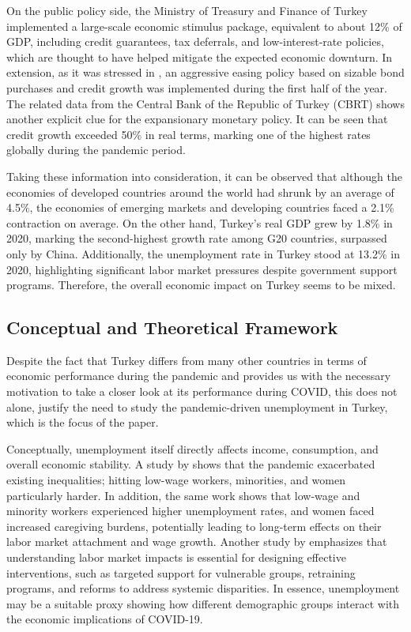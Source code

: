 \documentclass[a4paper,12pt]{article}
\begin{document}
    \indent On the public policy side, the Ministry of Treasury and Finance of Turkey implemented a large-scale economic stimulus package, equivalent to about 12\% of GDP, including credit guarantees, tax deferrals, and low-interest-rate policies, which are thought to have helped mitigate the expected economic downturn. In extension, as it was stressed in \cite{demiralp2020}, an aggressive easing policy based on sizable bond purchases and credit growth was implemented during the first half of the year. The related data from the Central Bank of the Republic of Turkey (CBRT) shows another explicit clue for the expansionary monetary policy. It can be seen that credit growth exceeded 50\% in real terms, marking one of the highest rates globally during the pandemic period.

    \indent Taking these information into consideration, it can be observed that although the economies of developed countries around the world had shrunk by an average of 4.5\%, the economies of emerging markets and developing countries faced a 2.1\% contraction on average. On the other hand, Turkey’s real GDP grew by 1.8\% in 2020, marking the second-highest growth rate among G20 countries, surpassed only by China. Additionally, the unemployment rate in Turkey stood at 13.2\% in 2020, highlighting significant labor market pressures despite government support programs. Therefore, the overall economic impact on Turkey seems to be mixed.
 


\subsection{Conceptual and Theoretical Framework}
\indent Despite the fact that Turkey differs from many other countries in terms of economic performance during the pandemic and provides us with the necessary motivation to take a closer look at its performance during COVID, this does not alone, justify the need to study the pandemic-driven unemployment in Turkey, which is the focus of the paper. 

\indent Conceptually, unemployment itself directly affects income, consumption, and overall economic stability. A study by \cite{piacentini2024} shows that the pandemic exacerbated existing inequalities; hitting low-wage workers, minorities, and women particularly harder. In addition, the same work shows that low-wage and minority workers experienced higher unemployment rates, and women faced increased caregiving burdens, potentially leading to long-term effects on their labor market attachment and wage growth. Another study by \cite{hershbein2020} emphasizes that understanding labor market impacts is essential for designing effective interventions, such as targeted support for vulnerable groups, retraining programs, and reforms to address systemic disparities. In essence, unemployment may be a suitable proxy showing how different demographic groups interact with the economic implications of COVID-19. 
\end{document}
